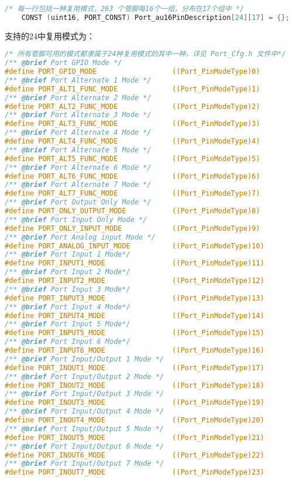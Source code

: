 \begin{lstlisting}[language=C,style=C]
    /* 每一行包括一种复用模式，263 个管脚每16个一组，分布在17个组中 */
    CONST (uint16, PORT_CONST) Port_au16PinDescription[24][17] = {};
\end{lstlisting}

支持的24中复用模式为：
\begin{lstlisting}[language=C,style=C]
    /* 所有管脚可用的模式都隶属于24种复用模式的其中一种，详见 Port_Cfg.h 文件中*/
/** @brief Port GPIO Mode */
#define PORT_GPIO_MODE                  ((Port_PinModeType)0)
/** @brief Port Alternate 1 Mode */
#define PORT_ALT1_FUNC_MODE             ((Port_PinModeType)1)
/** @brief Port Alternate 2 Mode */
#define PORT_ALT2_FUNC_MODE             ((Port_PinModeType)2)
/** @brief Port Alternate 3 Mode */
#define PORT_ALT3_FUNC_MODE             ((Port_PinModeType)3)
/** @brief Port Alternate 4 Mode */
#define PORT_ALT4_FUNC_MODE             ((Port_PinModeType)4)
/** @brief Port Alternate 5 Mode */
#define PORT_ALT5_FUNC_MODE             ((Port_PinModeType)5)
/** @brief Port Alternate 6 Mode */
#define PORT_ALT6_FUNC_MODE             ((Port_PinModeType)6)
/** @brief Port Alternate 7 Mode */
#define PORT_ALT7_FUNC_MODE             ((Port_PinModeType)7)
/** @brief Port Output Only Mode */
#define PORT_ONLY_OUTPUT_MODE           ((Port_PinModeType)8)
/** @brief Port Input Only Mode */
#define PORT_ONLY_INPUT_MODE            ((Port_PinModeType)9)
/** @brief Port Analog input Mode */
#define PORT_ANALOG_INPUT_MODE          ((Port_PinModeType)10)
/** @brief Port Input 1 Mode*/
#define PORT_INPUT1_MODE                ((Port_PinModeType)11)
/** @brief Port Input 2 Mode*/
#define PORT_INPUT2_MODE                ((Port_PinModeType)12)
/** @brief Port Input 3 Mode*/
#define PORT_INPUT3_MODE                ((Port_PinModeType)13)
/** @brief Port Input 4 Mode*/
#define PORT_INPUT4_MODE                ((Port_PinModeType)14)
/** @brief Port Input 5 Mode*/
#define PORT_INPUT5_MODE                ((Port_PinModeType)15)
/** @brief Port Input 6 Mode*/
#define PORT_INPUT6_MODE                ((Port_PinModeType)16)
/** @brief Port Input/Output 1 Mode */
#define PORT_INOUT1_MODE                ((Port_PinModeType)17)
/** @brief Port Input/Output 2 Mode */
#define PORT_INOUT2_MODE                ((Port_PinModeType)18)
/** @brief Port Input/Output 3 Mode */
#define PORT_INOUT3_MODE                ((Port_PinModeType)19)
/** @brief Port Input/Output 4 Mode */
#define PORT_INOUT4_MODE                ((Port_PinModeType)20)
/** @brief Port Input/Output 5 Mode */
#define PORT_INOUT5_MODE                ((Port_PinModeType)21)
/** @brief Port Input/Output 6 Mode */
#define PORT_INOUT6_MODE                ((Port_PinModeType)22)
/** @brief Port Input/Output 7 Mode */
#define PORT_INOUT7_MODE                ((Port_PinModeType)23)
\end{lstlisting}

